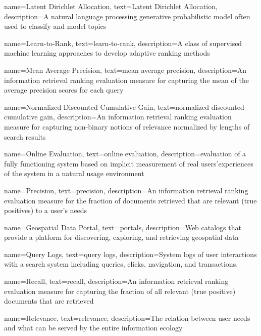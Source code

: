 {
    name=Latent Dirichlet Allocation,
    text=Latent Dirichlet Allocation,
    description=A natural language processing generative probabilistic model often used to classify and model topics
}

{
    name=Learn-to-Rank,
    text=learn-to-rank,
    description=A class of supervised machine learning approaches to develop adaptive ranking methods
}

{
    name=Mean Average Precision,
    text=mean average precision,
    description=An information retrieval ranking evaluation measure for capturing the mean of the average precision scores for each query
}

{
    name=Normalized Discounted Cumulative Gain,
    text=normalized discounted cumulative gain,
    description=An information retrieval ranking evaluation measure for capturing non-binary notions of relevance normalized by lengths of search results
}

{
    name=Online Evaluation,
    text=online evaluation,
    description={evaluation of a fully functioning system based on implicit measurement of real users’experiences of the system in a natural usage environment \cite{Hofmann2016}}
}

{
    name=Precision,
    text=precision,
    description=An information retrieval ranking evaluation measure for the fraction of documents retrieved that are relevant (true positives) to a user's needs
}

{
    name=Geospatial Data Portal,
    text=portals,
    description={Web catalogs that provide a platform for discovering, exploring, and retrieving geospatial data}
}

{
    name=Query Logs,
    text=query logs,
    description={System logs of user interactions with a search system including queries, clicks, navigation, and transactions.}
}

{
    name=Recall,
    text=recall,
    description=An information retrieval ranking evaluation measure for capturing the fraction of all relevant (true positive) documents that are retrieved
}

{
    name=Relevance,
    text=relevance,
    description=The relation between user needs and what can be served by  the  entire  information  ecology \cite{Hjorland2010}
}

